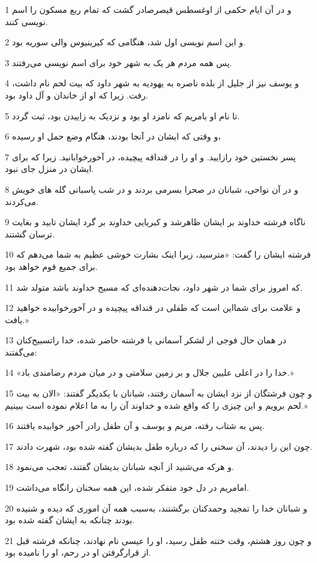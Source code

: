 \par 1 و در آن ایام حکمی از اوغسطس قیصرصادر گشت که تمام ربع مسکون را اسم نویسی کنند.
\par 2 و این اسم نویسی اول شد، هنگامی که کیرینیوس والی سوریه بود.
\par 3 پس همه مردم هر یک به شهر خود برای اسم نویسی می‌رفتند.
\par 4 و یوسف نیز از جلیل از بلده ناصره به یهودیه به شهر داود که بیت لحم نام داشت، رفت. زیرا که او از خاندان و آل داود بود.
\par 5 تا نام او بامریم که نامزد او بود و نزدیک به زاییدن بود، ثبت گردد.
\par 6 و وقتی که ایشان در آنجا بودند، هنگام وضع حمل او رسیده،
\par 7 پسر نخستین خود رازایید. و او را در قنداقه پیچیده، در آخورخوابانید. زیرا که برای ایشان در منزل جای نبود.
\par 8 و در آن نواحی، شبانان در صحرا بسرمی بردند و در شب پاسبانی گله های خویش می‌کردند.
\par 9 ناگاه فرشته خداوند بر ایشان ظاهرشد و کبریایی خداوند بر گرد ایشان تابید و بغایت ترسان گشتند.
\par 10 فرشته ایشان را گفت: «مترسید، زیرا اینک بشارت خوشی عظیم به شما می‌دهم که برای جمیع قوم خواهد بود.
\par 11 که امروز برای شما در شهر داود، نجات‌دهنده‌ای که مسیح خداوند باشد متولد شد.
\par 12 و علامت برای شمااین است که طفلی در قنداقه پیچیده و در آخورخوابیده خواهید یافت.»
\par 13 در همان حال فوجی از لشکر آسمانی با فرشته حاضر شده، خدا راتسبیح‌کنان می‌گفتند:
\par 14 «خدا را در اعلی علیین جلال و بر زمین سلامتی و در میان مردم رضامندی باد.»
\par 15 و چون فرشتگان از نزد ایشان به آسمان رفتند، شبانان با یکدیگر گفتند: «الان به بیت لحم برویم و این چیزی را که واقع شده و خداوند آن را به ما اعلام نموده است ببینیم.»
\par 16 پس به شتاب رفته، مریم و یوسف و آن طفل رادر آخور خوابیده یافتند.
\par 17 چون این را دیدند، آن سخنی را که درباره طفل بدیشان گفته شده بود، شهرت دادند.
\par 18 و هر‌که می‌شنید از آنچه شبانان بدیشان گفتند، تعجب می‌نمود.
\par 19 امامریم در دل خود متفکر شده، این همه سخنان رانگاه می‌داشت.
\par 20 و شبانان خدا را تمجید وحمدکنان برگشتند، به‌سبب همه آن اموری که دیده و شنیده بودند چنانکه به ایشان گفته شده بود.
\par 21 و چون روز هشتم، وقت ختنه طفل رسید، او را عیسی نام نهادند، چنانکه فرشته قبل از قرارگرفتن او در رحم، او را نامیده بود.
